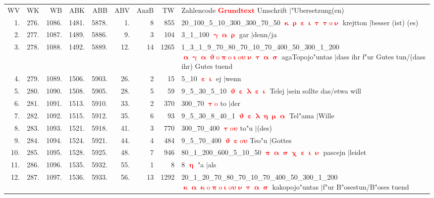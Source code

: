 \documentclass[a4paper,10pt,landscape]{article}
\begin{document}
\begin{tabular}{rrrrrrrrp{120mm}}
WV&WK&WB&ABK&ABB&ABV&AnzB&TW&Zahlencode \textcolor{red}{$\boldsymbol{Grundtext}$} Umschrift $|$"Ubersetzung(en)\\
1.&276.&1086.&1481.&5878.&1.&8&855&20\_100\_5\_10\_300\_300\_70\_50 \textcolor{red}{$\boldsymbol{\upkappa\uprho\upepsilon\upiota\uptau\uptau\mathrm{o}\upnu}$} krejtton $|$besser (ist) (es)\\
2.&277.&1087.&1489.&5886.&9.&3&104&3\_1\_100 \textcolor{red}{$\boldsymbol{\upgamma\upalpha\uprho}$} gar $|$denn/ja\\
3.&278.&1088.&1492.&5889.&12.&14&1265&1\_3\_1\_9\_70\_80\_70\_10\_70\_400\_50\_300\_1\_200 \textcolor{red}{$\boldsymbol{\upalpha\upgamma\upalpha\upvartheta\mathrm{o}\uppi\mathrm{o}\upiota\mathrm{o}\upsilon\upnu\uptau\upalpha\upsigma}$} agaTopojo"untas $|$dass ihr f"ur Gutes tun/(dass ihr) Gutes tuend\\
4.&279.&1089.&1506.&5903.&26.&2&15&5\_10 \textcolor{red}{$\boldsymbol{\upepsilon\upiota}$} ej $|$wenn\\
5.&280.&1090.&1508.&5905.&28.&5&59&9\_5\_30\_5\_10 \textcolor{red}{$\boldsymbol{\upvartheta\upepsilon\uplambda\upepsilon\upiota}$} Telej $|$sein sollte das/etwa will\\
6.&281.&1091.&1513.&5910.&33.&2&370&300\_70 \textcolor{red}{$\boldsymbol{\uptau\mathrm{o}}$} to $|$der\\
7.&282.&1092.&1515.&5912.&35.&6&93&9\_5\_30\_8\_40\_1 \textcolor{red}{$\boldsymbol{\upvartheta\upepsilon\uplambda\upeta\upmu\upalpha}$} Tel"ama $|$Wille\\
8.&283.&1093.&1521.&5918.&41.&3&770&300\_70\_400 \textcolor{red}{$\boldsymbol{\uptau\mathrm{o}\upsilon}$} to"u $|$(des)\\
9.&284.&1094.&1524.&5921.&44.&4&484&9\_5\_70\_400 \textcolor{red}{$\boldsymbol{\upvartheta\upepsilon\mathrm{o}\upsilon}$} Teo"u $|$Gottes\\
10.&285.&1095.&1528.&5925.&48.&7&946&80\_1\_200\_600\_5\_10\_50 \textcolor{red}{$\boldsymbol{\uppi\upalpha\upsigma\upchi\upepsilon\upiota\upnu}$} pascejn $|$leidet\\
11.&286.&1096.&1535.&5932.&55.&1&8&8 \textcolor{red}{$\boldsymbol{\upeta}$} "a $|$als\\
12.&287.&1097.&1536.&5933.&56.&13&1292&20\_1\_20\_70\_80\_70\_10\_70\_400\_50\_300\_1\_200 \textcolor{red}{$\boldsymbol{\upkappa\upalpha\upkappa\mathrm{o}\uppi\mathrm{o}\upiota\mathrm{o}\upsilon\upnu\uptau\upalpha\upsigma}$} kakopojo"untas $|$f"ur B"osestun/B"oses tuend\\
\end{tabular}\medskip \\
\end{document}
